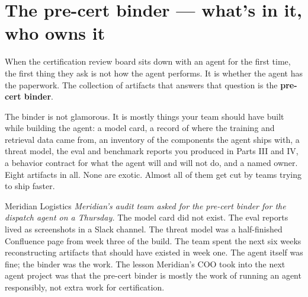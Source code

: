 \label{ch:50-certification-18-pre-cert}

\starttwocol

\section{The pre-cert binder --- what's in it, who owns it}

When the certification review board sits down with an agent for the first time, the first thing they ask is not how the agent performs. It is whether the agent has the paperwork. The collection of artifacts that answers that question is the \textbf{pre-cert binder}.

The binder is not glamorous. It is mostly things your team should have built while building the agent: a model card, a record of where the training and retrieval data came from, an inventory of the components the agent ships with, a threat model, the eval and benchmark reports you produced in Parts III and IV, a behavior contract for what the agent will and will not do, and a named owner. Eight artifacts in all. None are exotic. Almost all of them get cut by teams trying to ship faster.

\begin{TNinpractice}{Meridian Logistics} \textit{Meridian's audit team asked for the pre-cert binder for the dispatch agent on a Thursday.} The model card did not exist. The eval reports lived as screenshots in a Slack channel. The threat model was a half-finished Confluence page from week three of the build. The team spent the next six weeks reconstructing artifacts that should have existed in week one. The agent itself was fine; the binder was the work. The lesson Meridian's COO took into the next agent project was that the pre-cert binder is mostly the work of running an agent responsibly, not extra work for certification. \end{TNinpractice}

